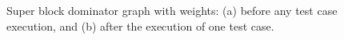 
\begin{figure}[!ht]
\begin{center}
\qquad
{}
\caption{Super block dominator graph with weights: (a) before any
test case execution, and (b) after the execution of one test
case.}\label{fig-weight}
\end{center}
\end{figure}
